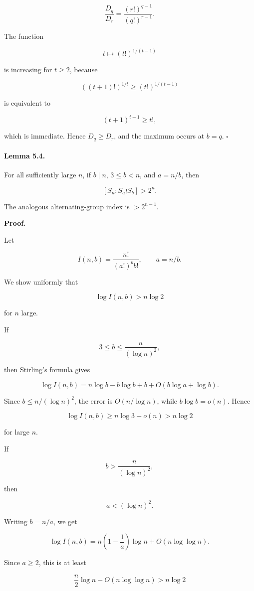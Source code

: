 \documentclass[11pt]{article}
\begin{document}
\[
\frac{D_q}{D_r}
=
\frac{(r!)^{q-1}}{(q!)^{r-1}}.
\]

The function

\[
t\mapsto (t!)^{1/(t-1)}
\]

is increasing for $t\ge2$, because

\[
((t+1)!)^{1/t}\ge (t!)^{1/(t-1)}
\]

is equivalent to

\[
(t+1)^{t-1}\ge t!,
\]

which is immediate. Hence $D_q\ge D_r$, and the maximum occurs at $b=q$. $\square$

\paragraph{Lemma 5.4.}

For all sufficiently large $n$, if $b\mid n$, $3\le b<n$, and $a=n/b$, then

\[
[S_n:S_a\wr S_b]>2^n.
\]

The analogous alternating-group index is $>2^{n-1}$.

\noindent\textbf{Proof.}

Let

\[
I(n,b)=\frac{n!}{(a!)^b b!},
\qquad a=n/b.
\]

We show uniformly that

\[
\log I(n,b)>n\log2
\]

for $n$ large.

If

\[
3\le b\le \frac{n}{(\log n)^2},
\]

then Stirling's formula gives

\[
\log I(n,b)
=
n\log b-b\log b+b+O(b\log a+\log b).
\]

Since $b\le n/(\log n)^2$, the error is $O(n/\log n)$, while $b\log b=o(n)$. Hence

\[
\log I(n,b)\ge n\log3-o(n)>n\log2
\]

for large $n$.

If

\[
b>\frac{n}{(\log n)^2},
\]

then

\[
a<(\log n)^2.
\]

Writing $b=n/a$, we get

\[
\log I(n,b)
=
n\left(1-\frac1a\right)\log n
+
O(n\log\log n).
\]

Since $a\ge2$, this is at least

\[
\frac n2\log n-O(n\log\log n)>n\log2
\]
\end{document}

